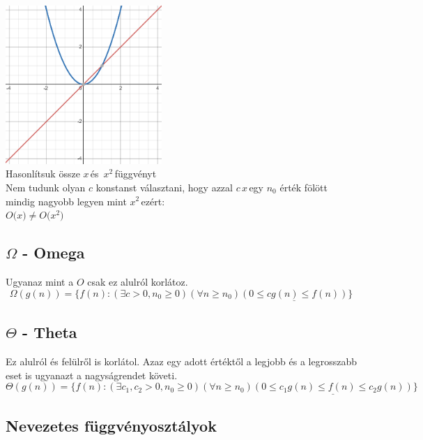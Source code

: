 \documentclass{article}
\theoremstyle{mytheoremstyle}
\theoremstyle{mytheoremstyle}
\theoremstyle{myproblemstyle}
\begin{document}
\begin{center}
    \includegraphics[height=6cm]{o2}\\
    Hasonlítsuk össze \color{red}$x$\color{black}\,és\,
    \color{blue}$x^2$\color{black}\,függvényt\\
    Nem tudunk olyan $c$ konstanst választani, hogy azzal
    $c$\,\color{red}$x$\color{black}\,egy
    $n_0$ érték fölött mindig nagyobb legyen mint
    \color{blue}$x^2$\color{black}\,ezért:\\
    $O($\color{red}$x$\color{black}$)\neq O($\color{blue}$x^2$\color{black}$)$
\end{center}

\subsection{$\Omega$ - Omega}
Ugyanaz mint a $O$ csak ez alulról korlátoz.
\[\Omega(g(n))=\{f(n):(\exists c>0,n_0\geq 0)(\forall n\geq n_0)
    \underline{(0\leq cg(n)\leq f(n))}
    \}\]

\subsection{$\Theta$ - Theta}
Ez alulról és felülről is korlátol. Azaz egy adott értéktől
a legjobb és a legrosszabb eset is ugyanazt a nagyságrendet követi.
\[\Theta(g(n))=\{f(n):(\exists c_1,c_2>0,n_0\geq 0)(\forall n\geq n_0)
    \underline{(0\leq c_1g(n)\leq f(n)\leq c_2g(n))}
    \}\]

\subsection{Nevezetes függvényosztályok}
\end{document}
